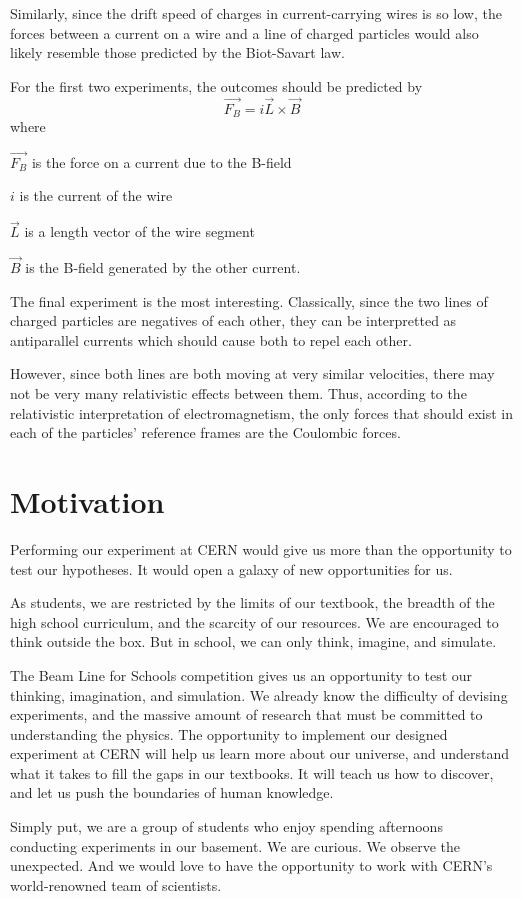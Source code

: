 \documentclass[12pt,letterpaper]{article}
\begin{document}
Similarly, since the drift speed of charges in current-carrying wires is so low, the forces between a current on a wire and a line of charged particles would also likely resemble those predicted by the Biot-Savart law.

For the first two experiments, the outcomes should be predicted by \[ %
	\vec{F_B} = i\vec{L}\times \vec{B}
\]
where
\begin{description}
	\item $\vec{F_B}$ is the force on a current due to the B-field
	\item $i$ is the current of the wire
	\item $\vec{L}$ is a length vector of the wire segment
	\item $\vec{B}$ is the B-field generated by the other current.
\end{description}

The final experiment is the most interesting. Classically, since the two lines of charged particles are negatives of each other, they can be interpretted as antiparallel currents which should cause both to repel each other.

However, since both lines are both moving at very similar velocities, there may not be very many relativistic effects between them. Thus, according to the relativistic interpretation of electromagnetism, the only forces that should exist in each of the particles' reference frames are the Coulombic forces.

\section{Motivation}
Performing our experiment at CERN would give us more than the opportunity to test our hypotheses. It would open a galaxy of new opportunities for us.

As students, we are restricted by the limits of our textbook, the breadth of the high school curriculum, and the scarcity of our resources. We are encouraged to think outside the box. But in school, we can only think, imagine, and simulate.

The Beam Line for Schools competition gives us an opportunity to test our thinking, imagination, and simulation. We already know the difficulty of devising experiments, and the massive amount of research that must be committed to understanding the physics. The opportunity to implement our designed experiment at CERN will help us learn more about our universe, and understand what it takes to fill the gaps in our textbooks.
It will teach us how to discover, and let us push the boundaries of human knowledge.

Simply put, we are a group of students who enjoy spending afternoons conducting experiments in our basement. We are curious. We observe the unexpected.
And we would love to have the opportunity to work with CERN’s world-renowned team of scientists.
\end{document}
